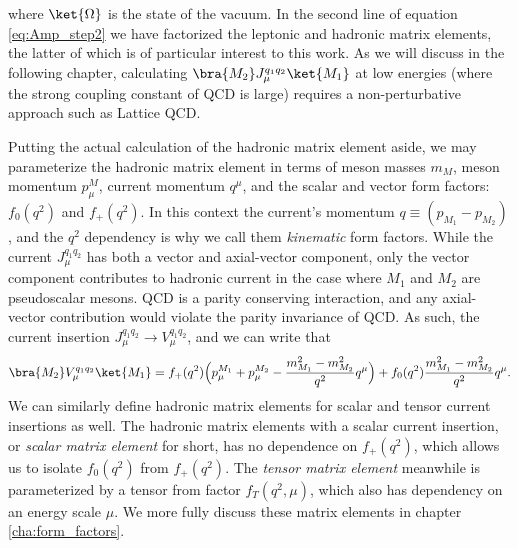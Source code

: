 where $\ket{\Omega}$ is the state of the vacuum. In the second line of equation \ref{eq:Amp_step2} we have factorized the leptonic and hadronic matrix elements, the latter of which is of particular interest to this work.  As we will  discuss in the following chapter, calculating $\bra{M_2}J_\mu^{q_1q_2}\ket{M_1}$ at low energies (where the strong coupling constant of QCD is large) requires a non-perturbative approach such as Lattice QCD.  

Putting the actual calculation of the hadronic matrix element aside, we may parameterize the hadronic matrix element in terms of meson masses $m_M$, meson momentum $p_\mu^M$, current momentum $q^\mu$, and the scalar and vector form factors: $f_0(q^2)$ and $f_+(q^2)$.  In this context the current's momentum $q\equiv (p_{M_1} - p_{M_2})$, and the $q^2$ dependency is why we call them \textit{kinematic} form factors.  While the current $J_\mu^{q_1q_2}$ has both a vector and axial-vector component, only the vector component contributes to hadronic current in the case where $M_1$ and $M_2$ are pseudoscalar mesons.  QCD is a parity conserving interaction, and any axial-vector contribution would violate the parity invariance of QCD.  As such, the current insertion $J_\mu^{q_1q_2} \rightarrow V_\mu^{q_1q_2}$, and we can write that
\begin{equation}
    \bra{M_2}V_{\mu}^{q_1q_2}\ket{M_1}=f_+(q^2)\Big(p^{M_1}_{\mu}+p^{M_2}_{\mu}- \frac{m_{M_1}^2-m_{M_2}^2}{q^2}q^{\mu}\Big)+f_0(q^2)\frac{m_{M_1}^2-m_{M_2}^2}{q^2}q^{\mu}.
\end{equation}
We can similarly define hadronic matrix elements for scalar and tensor current insertions as well.  The hadronic matrix elements with a scalar current insertion, or \textit{scalar matrix element} for short, has no dependence on $f_+(q^2)$, which allows us to isolate $f_0(q^2)$ from $f_+(q^2)$.  The \textit{tensor matrix element} meanwhile is parameterized by a tensor from factor $f_T(q^2,\mu)$, which also has dependency on an energy scale $\mu$.  We more fully discuss these matrix elements in chapter \ref{cha:form_factors}.

